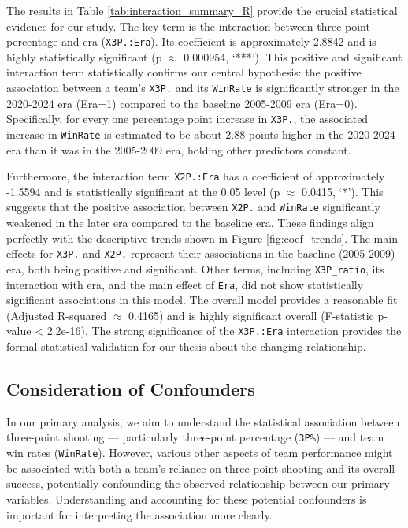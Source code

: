 \documentclass[11pt, a4paper]{article} %
\begin{document}
The results in Table \ref{tab:interaction_summary_R} provide the crucial statistical evidence for our study. 
The key term is the interaction between three-point percentage and era (\texttt{X3P.:Era}). Its coefficient is 
approximately 2.8842 and is highly statistically significant (p $\approx$ 0.000954, `***'). This positive and 
significant interaction term statistically confirms our central hypothesis: the positive association between a 
team's \texttt{X3P.} and its \texttt{WinRate} is significantly stronger in the 2020-2024 era (Era=1) compared to 
the baseline 2005-2009 era (Era=0). Specifically, for every one percentage point increase in \texttt{X3P.}, the 
associated increase in \texttt{WinRate} is estimated to be about 2.88 points higher in the 2020-2024 era than it 
was in the 2005-2009 era, holding other predictors constant.

Furthermore, the interaction term \texttt{X2P.:Era} has a coefficient of approximately -1.5594 and is statistically 
significant at the 0.05 level (p $\approx$ 0.0415, `*'). This suggests that the positive association between \texttt{X2P.} 
and \texttt{WinRate} significantly weakened in the later era compared to the baseline era. These findings align perfectly 
with the descriptive trends shown in Figure \ref{fig:coef_trends}. The main effects for \texttt{X3P.} and \texttt{X2P.} 
represent their associations in the baseline (2005-2009) era, both being positive and significant. Other terms, including 
\texttt{X3P\_ratio}, its interaction with era, and the main effect of \texttt{Era}, did not show statistically significant 
associations in this model. The overall model provides a reasonable fit (Adjusted R-squared $\approx$ 0.4165) and is 
highly significant overall (F-statistic p-value < 2.2e-16). The strong significance of the \texttt{X3P.:Era} interaction 
provides the formal statistical validation for our thesis about the changing relationship.

\subsection{Consideration of Confounders}
In our primary analysis, we aim to understand the statistical association between three-point shooting --- particularly 
three-point percentage (\texttt{3P\%}) --- and team win rates (\texttt{WinRate}). However, various other aspects of team 
performance might be associated with both a team's reliance on three-point shooting and its overall success, potentially 
confounding the observed relationship between our primary variables. Understanding and accounting for these potential confounders 
is important for interpreting the association more clearly.
\end{document}
